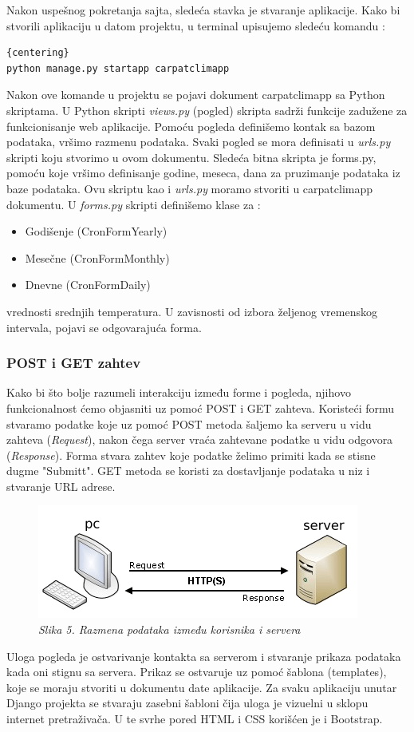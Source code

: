 \documentclass[12pt]{article}
\begin{document}
Nakon uspešnog pokretanja sajta, sledeća stavka je stvaranje aplikacije. Kako bi stvorili aplikaciju u datom projektu, u terminal upisujemo sledeću komandu :
\begin{lstlisting}{centering}
python manage.py startapp carpatclimapp
\end{lstlisting}
Nakon ove komande u projektu se pojavi dokument carpatclimapp sa Python skriptama. U Python skripti \textit{views.py} (pogled) skripta sadrži funkcije zadužene za funkcionisanje web aplikacije. Pomoću pogleda definišemo kontak sa bazom podataka, vršimo razmenu podataka. Svaki pogled se mora definisati u \textsl{urls.py} skripti koju stvorimo u ovom dokumentu. Sledeća bitna skripta je forms.py, pomoću koje vršimo definisanje godine, meseca, dana za pruzimanje podataka iz baze podataka. Ovu skriptu kao i \textsl{urls.py} moramo stvoriti u carpatclimapp dokumentu. U \textsl{forms.py} skripti definišemo klase za :
\begin{itemize}
	\item Godišenje (CronFormYearly)
	\item Mesečne (CronFormMonthly)
	\item Dnevne (CronFormDaily)
\end{itemize}
vrednosti srednjih temperatura. U zavisnosti od izbora željenog vremenskog intervala, pojavi se odgovarajuća forma.
\subsubsection{POST i GET zahtev}
Kako bi što bolje razumeli interakciju između forme i pogleda, njihovo funkcionalnost ćemo objasniti uz pomoć POST i GET zahteva. Koristeći formu stvaramo podatke koje uz pomoć POST metoda šaljemo ka serveru u vidu zahteva (\textsl{Request}), nakon čega server vraća zahtevane podatke u vidu odgovora (\textsl{Response}). Forma stvara zahtev koje podatke želimo primiti kada se stisne dugme "{Submitt}". GET metoda se koristi za dostavljanje podataka u niz i stvaranje URL adrese. 
\begin{figure}[h!]
	\centering
	\includegraphics[width=0.6\linewidth]{server.png}
	\caption*{\textsl{Slika 5. Razmena podataka između korisnika i servera}}
\end{figure}
Uloga pogleda je ostvarivanje kontakta sa serverom i stvaranje prikaza podataka kada oni stignu sa servera. Prikaz se ostvaruje uz pomoć  šablona  (templates), koje se moraju stvoriti u dokumentu date aplikacije. Za svaku aplikaciju unutar Django projekta se stvaraju zasebni šabloni čija uloga je vizuelni u sklopu internet pretraživača. U te svrhe pored HTML i CSS korišćen je i Bootstrap.
\end{document}
